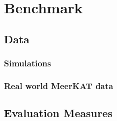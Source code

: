 \section{Benchmark}

\subsection{Data}
\subsubsection{Simulations}

\subsubsection{Real world MeerKAT data}

\subsection{Evaluation Measures}

